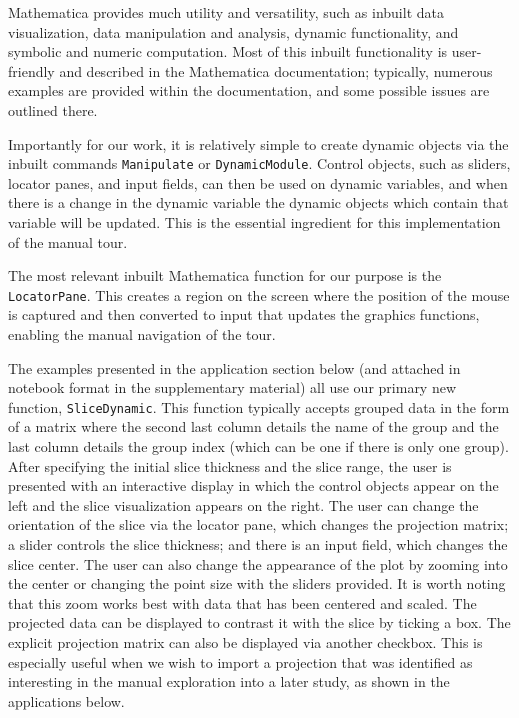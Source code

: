 \documentclass[]{interact}
\theoremstyle{plain}%
\theoremstyle{definition}
\theoremstyle{remark}
\begin{document}
Mathematica provides much utility and versatility, such as inbuilt data
visualization, data manipulation and analysis, dynamic functionality,
and symbolic and numeric computation. Most of this inbuilt functionality
is user-friendly and described in the Mathematica documentation;
typically, numerous examples are provided within the documentation, and
some possible issues are outlined there.

Importantly for our work, it is relatively simple to create dynamic
objects via the inbuilt commands \texttt{Manipulate} or
\texttt{DynamicModule}. Control objects, such as sliders, locator panes,
and input fields, can then be used on dynamic variables, and when there
is a change in the dynamic variable the dynamic objects which contain
that variable will be updated. This is the essential ingredient for this
implementation of the manual tour.

The most relevant inbuilt Mathematica function for our purpose is the
\texttt{LocatorPane}. This creates a region on the screen where the
position of the mouse is captured and then converted to input that
updates the graphics functions, enabling the manual navigation of the
tour.

The examples presented in the application section below (and attached in
notebook format in the supplementary material) all use our primary new
function, \texttt{SliceDynamic}. This function typically accepts grouped
data in the form of a matrix where the second last column details the
name of the group and the last column details the group index (which can
be one if there is only one group). After specifying the initial slice
thickness and the slice range, the user is presented with an interactive
display in which the control objects appear on the left and the slice
visualization appears on the right. The user can change the orientation
of the slice via the locator pane, which changes the projection matrix;
a slider controls the slice thickness; and there is an input field,
which changes the slice center. The user can also change the appearance
of the plot by zooming into the center or changing the point size with
the sliders provided. It is worth noting that this zoom works best with
data that has been centered and scaled. The projected data can be
displayed to contrast it with the slice by ticking a box. The explicit
projection matrix can also be displayed via another checkbox. This is
especially useful when we wish to import a projection that was
identified as interesting in the manual exploration into a later study,
as shown in the applications below.
\end{document}
